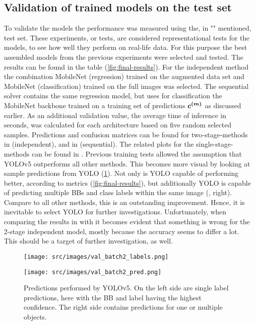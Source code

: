 \subsection{Validation of trained models on the test set}\label{subsec:validation-of-trained-models}
To validate the models the performance was measured using the, in "" mentioned, test set.
These experiments, or tests, are considered representational tests for the models, to see how well they perform on real-life data.
For this purpose the best assembled models from the previous experiments were selected and tested.
The results can be found in the table (\ref{fig:final-results}).
For the independent method the combination MobileNet (regression) trained on the augmented data set and MobileNet (classification) trained on the full images was selected.
The sequential solver contains the same regression model, but uses for classification the MobileNet backbone trained on a training set of predictions $\bm{c^{(m)}}$ as discussed earlier.
As an additional validation value, the average time of inference in seconds, was calculated for each architecture based on five random selected samples.
Predictions and confusion matrices can be found for two-stage-methods in  (independent), and in  (sequential).
The related plots for the single-stage-methods can be found in .
Previous training tests allowed the assumption that YOLOv5 outperforms all other methods.
This becomes more visual by looking at sample predictions from YOLO (\ref{fig:yolo-predictions}).
Not only is YOLO capable of performing better, according to metrics (\ref{fig:final-results}), but additionally YOLO is capable of predicting multiple BBs and class labels within the same image (, right).
Compare to all other methods, this is an outstanding improvement.
Hence, it is inevitable to select YOLO for further investigations.
Unfortunately, when comparing the results in  with  it becomes evident that something is wrong for the 2-stage independent model, mostly because the accuracy seems to differ a lot.
This should be a target of further investigation, as well.
\begin{figure}[!ht]
    \centering
    \begin{minipage}{.475\textwidth}
        \texttt{[image: src/images/val\_batch2\_labels.png]}
    \end{minipage}
    \hfill
    \begin{minipage}{.475\textwidth}
        \texttt{[image: src/images/val\_batch2\_pred.png]}
    \end{minipage}
    \caption{Predictions performed by YOLOv5. On the left side are single label predictions, here with the BB and label having the highest confidence. The right side contains predictions for one or multiple objects.}
    \label{fig:yolo-predictions}
\end{figure}
